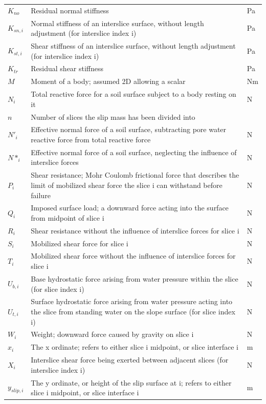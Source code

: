 \documentclass[12pt]{article}
\begin{document}
\begin{longtable*}{l l l}
\\
$K_{no}$ & Residual normal stiffness & Pa
\\
$K_{sn,i}$ & Normal stiffness of an interslice surface, without length adjustment (for interslice index i) & Pa
\\
$K_{st,i}$ & Shear stiffness of an interslice surface, without length adjustment (for interslice index i) & Pa
\\
$K_{tr}$ & Residual shear stiffness & Pa
\\
$M$ & Moment of a body; assumed 2D allowing a scalar & Nm
\\
$N_{i}$ & Total reactive force for a soil surface subject to a body resting on it & N
\\
$n$ & Number of slices the slip mass has been divided into & 
\\
$N'_{i}$ & Effective normal force of a soil surface, subtracting pore water reactive force from total reactive force & N
\\
$N*_{i}$ & Effective normal force of a soil surface, neglecting the influence of interslice forces & N
\\
$P_{i}$ & Shear resistance; Mohr Coulomb frictional force that describes the limit of mobilized shear force the slice i can withstand before failure & N
\\
$Q_{i}$ & Imposed surface load; a downward force acting into the surface from midpoint of slice i & N
\\
$R_{i}$ & Shear resistance without the influence of interslice forces for slice i & N
\\
$S_{i}$ & Mobilized shear force for slice i & N
\\
$T_{i}$ & Mobilized shear force without the influence of interslice forces for slice i & N
\\
$U_{b,i}$ & Base hydrostatic force arising from water pressure within the slice (for slice index i) & N
\\
$U_{t,i}$ & Surface hydrostatic force arising from water pressure acting into the slice from standing water on the slope surface (for slice index i) & N
\\
$W_{i}$ & Weight; downward force caused by gravity on slice i & N
\\
$x_{i}$ & The x ordinate; refers to either slice i midpoint, or slice interface i & m
\\
$X_{i}$ & Interslice shear force being exerted between adjacent slices (for interslice index i) & N
\\
$y_{slip,i}$ & The y ordinate, or height of the slip surface at i; refers to either slice i midpoint, or slice interface i & m

\end{longtable*}
\end{document}
